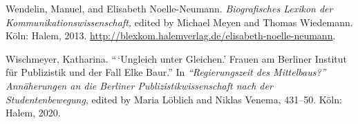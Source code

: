 \documentclass{tufte-handout}
\begin{document}
\begin{hangparas}{.25in}{1}
Wendelin, Manuel, and Elisabeth Noelle-Neumann. \emph{Biografisches
Lexikon der Kommunikationswissenschaft,} edited by Michael Meyen and
Thomas Wiedemann. Köln: Halem, 2013.
\url{http://blexkom.halemverlag.de/elisabeth-noelle-neumann}.

Wischmeyer, Katharina. ``\,`Ungleich unter Gleichen.' Frauen am Berliner
Institut für Publizistik und der Fall Elke Baur.'' In
\emph{``Regierungszeit des Mittelbaus?'' Annäherungen an die Berliner
Publizistikwissenschaft nach der Studentenbewegung}, edited by Maria
Löblich and Niklas Venema, 431--50. Köln: Halem, 2020.



\end{hangparas}
\end{document}
